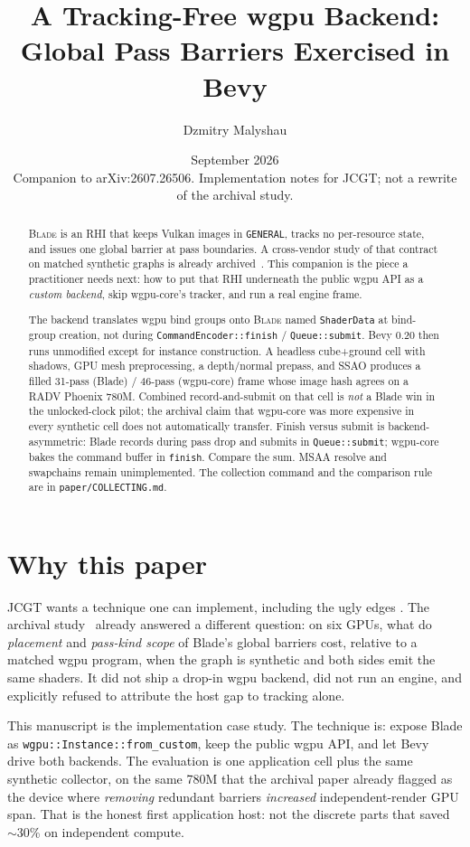 \documentclass[10pt,twocolumn]{article}
\title{A Tracking-Free wgpu Backend:\\
Global Pass Barriers Exercised in Bevy}
\author{Dzmitry Malyshau}
\date{September 2026 \\[0.4em]
\small Companion to arXiv:2607.26506. Implementation notes for JCGT;
not a rewrite of the archival study.}
\newcommand{\blade}{\textsc{Blade}}
\begin{document}
\maketitle

\begin{abstract}
\blade{} is an RHI that keeps Vulkan images in \texttt{GENERAL}, tracks no
per-resource state, and issues one global barrier at pass boundaries. A
cross-vendor study of that contract on matched synthetic graphs is already
archived~\cite{malyshau-sync-study}. This companion is the piece a
practitioner needs next: how to put that RHI underneath the public wgpu
API as a \emph{custom backend}, skip wgpu-core's tracker, and run a real
engine frame.

The backend translates wgpu bind groups onto \blade{} named
\texttt{ShaderData} at bind-group creation, not during
\texttt{CommandEncoder::finish} / \texttt{Queue::submit}. Bevy 0.20 then
runs unmodified except for instance construction. A headless cube+ground
cell with shadows, GPU mesh preprocessing, a depth/normal prepass, and
SSAO produces a filled 31-pass (Blade) / 46-pass (wgpu-core) frame whose
image hash agrees on a RADV Phoenix 780M. Combined record-and-submit on
that cell is \emph{not} a Blade win in the unlocked-clock pilot; the
archival claim that wgpu-core was more expensive in every synthetic cell
does not automatically transfer. Finish versus submit is backend-asymmetric:
Blade records during pass drop and submits in \texttt{Queue::submit};
wgpu-core bakes the command buffer in \texttt{finish}. Compare the sum.
MSAA resolve and swapchains remain unimplemented. The collection command
and the comparison rule are in \texttt{paper/COLLECTING.md}.
\end{abstract}

\section{Why this paper}

JCGT wants a technique one can implement, including the ugly edges
\cite{jcgt}. The archival study~\cite{malyshau-sync-study} already
answered a different question: on six GPUs, what do \emph{placement} and
\emph{pass-kind scope} of Blade's global barriers cost, relative to a
matched wgpu program, when the graph is synthetic and both sides emit the
same shaders. It did not ship a drop-in wgpu backend, did not run an
engine, and explicitly refused to attribute the host gap to tracking
alone.

This manuscript is the implementation case study. The technique is:
expose Blade as \texttt{wgpu::Instance::from\_custom}, keep the public
wgpu API, and let Bevy~\cite{bevy} drive both backends. The evaluation is
one application cell plus the same synthetic collector, on the same 780M
that the archival paper already flagged as the device where \emph{removing}
redundant barriers \emph{increased} independent-render GPU span. That is
the honest first application host: not the discrete parts that saved
$\sim$30\% on independent compute.
\end{document}
